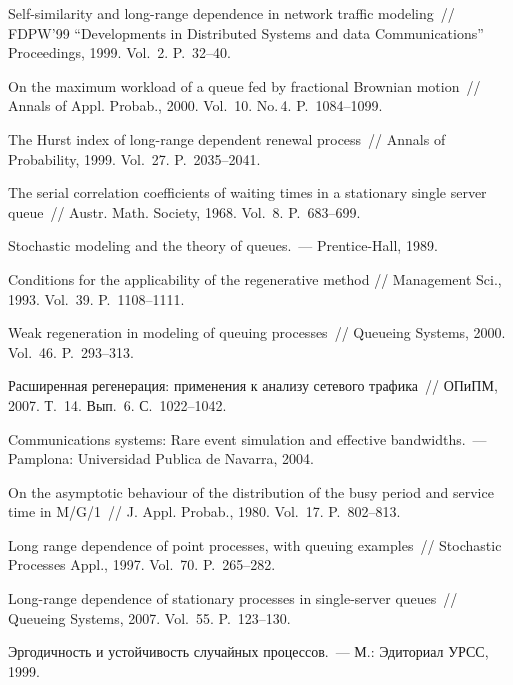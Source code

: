 \begin{multicols}{2}
{{\begin{thebibliography}{99}
Self-similarity and long-range dependence in network traffic
modeling~// FDPW'99 ``Developments in Distributed
Systems and data Communications'' Proceedings, 1999. Vol.~2. P.~32--40.

On the maximum workload of a queue fed by fractional Brownian motion~// Annals of Appl. Probab., 2000.
Vol.~10. No.\,4. P.~1084--1099.

The Hurst index of long-range dependent renewal process~// Annals of Probability, 1999. Vol.~27. P.~2035--2041.

 The serial correlation coefficients of waiting times in a stationary single server queue~//
Austr. Math. Society, 1968. Vol.~8. P.~683--699.

Stochastic modeling and the theory of queues.~--- Prentice-Hall, 1989.

Conditions for the applicability of the regenerative method // Management Sci., 1993. Vol.~39. P.~1108--1111.

Weak regeneration in modeling of queuing processes~// Queueing Systems, 2000. Vol.~46. P.~293--313.

Расширенная регенерация: применения к анализу сетевого трафика~// ОПиПМ, 2007. Т.~14. Вып.~6. С.~1022--1042.

Communications systems: Rare event simulation and effective bandwidths.~--- Pamplona: Universidad Publica de Navarra, 2004.

On the asymptotic behaviour of the distribution of the busy period and service time in M/G/1~// J. Appl. Probab.,
1980. Vol.~17. P.~802--813.

Long range dependence of point processes, with queuing examples~// Stochastic Processes Appl., 1997. Vol.~70. P.~265--282.

Long-range dependence of stationary proc\-esses in single-server queues~// Queueing Systems, 2007. Vol.~55. P.~123--130.

\label{end\stat}

Эргодичность и устойчивость случайных процессов.~--- М.: Эдиториал УРСС, 1999.



 \end{thebibliography}
}
}
\end{multicols}